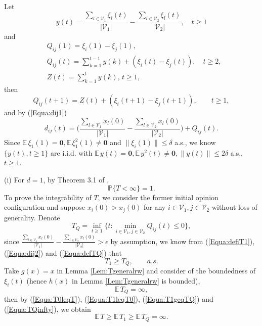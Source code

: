 \documentclass[11pt]{article}
\theoremstyle{definition}
\theoremstyle{remark}
\numberwithin{equation}{section}
\begin{document}
Let
\begin{equation*}
  y(t)=\frac{\sum_{l\in\mathcal{V}_1}\xi_l(t)}{|\mathcal{V}_1|}-\frac{\sum_{l\in\mathcal{V}_2}\xi_l(t)}{|\mathcal{V}_2|},\quad t\geq 1
\end{equation*}
and
\begin{equation*}
\begin{split}
  &Q_{ij}(1)=\xi_i(1)-\xi_j(1),\\
 &Q_{ij}(t)=\sum_{k=1}^{t-1}y(k)+(\xi_i(t)-\xi_j(t)), \quad t\geq 2,\\
  &Z(t)=\sum_{k=1}^ty(k), \,t\geq 1,
  \end{split}
\end{equation*}
then
\begin{equation}\label{Equa:QijZt}
  Q_{ij}(t+1)=Z(t)+(\xi_i(t+1)-\xi_j(t+1)),\qquad t\geq 1,
\end{equation}
and by (\ref{Equa:dij1})
\begin{equation}\label{Equa:dij2}
  d_{ij}(t)=\bigg(\frac{\sum_{l\in\mathcal{V}_1}x_l(0)}{|\mathcal{V}_1|}-\frac{\sum_{l\in\mathcal{V}_2}x_l(0)}{|\mathcal{V}_2|}\bigg)+Q_{ij}(t).
\end{equation}
Since $\mathbb{E}\,\xi_1(1)=\textbf{0}, \mathbb{E}\,\xi_1^2(1)\neq\textbf{0}$ and $\|\xi_i(1)\|\leq \delta$ a.s., we know $\{y(t), t\geq 1\}$ are i.i.d. with $\mathbb{E}\,y(t)=\textbf{0}, \mathbb{E}\,y^2(t)\neq\textbf{0}, \|y(t)\|\leq 2\delta$ a.s., $t\geq 1$.

(i) For $d=1$, by Theorem 3.1 of \cite{Su2019tac},
\begin{equation*}
  \mathbb{P}\{T<\infty\}=1.
\end{equation*}
To prove the integrability of $T$, we consider the former initial opinion configuration and suppose $x_i(0)>x_j(0)$ for any $i\in\mathcal{V}_1, j\in\mathcal{V}_2$ without loss of generality.
Denote
\begin{equation}\label{Equa:defTQ}
T_Q=\inf\limits_{t\geq 1}\Big\{t:\min\limits_{i\in\mathcal{V}_1, j\in\mathcal{V}_2}Q_{ij}(t)\leq 0\Big\},
\end{equation}
since $\frac{\sum_{l\in\mathcal{V}_1}x_l(0)}{|\mathcal{V}_1|}-\frac{\sum_{l\in\mathcal{V}_2}x_l(0)}{|\mathcal{V}_2|}>\epsilon$ by assumption, we know from (\ref{Equa:defiT1}), (\ref{Equa:dij2}) and (\ref{Equa:defTQ}) that
\begin{equation}\label{Equa:T1geqTQ}
  T_1\geq T_Q, \qquad a.s.
\end{equation}
Take $g(x)=x$ in Lemma \ref{Lem:Tgeneralrw} and consider of the boundedness of $\xi_i(t)$ (hence $h(x)$ in Lemma \ref{Lem:Tgeneralrw} is bounded),
\begin{equation}\label{Equa:TQinfty}
  \mathbb{E}\,T_Q=\infty,
\end{equation}
then by (\ref{Equa:T0leqT}), (\ref{Equa:T1leqT0}), (\ref{Equa:T1geqTQ}) and (\ref{Equa:TQinfty}), we obtain
\begin{equation*}
  \mathbb{E}\,T\geq \mathbb{E}\,T_1\geq \mathbb{E}\,T_Q=\infty.
\end{equation*}
\end{document}
